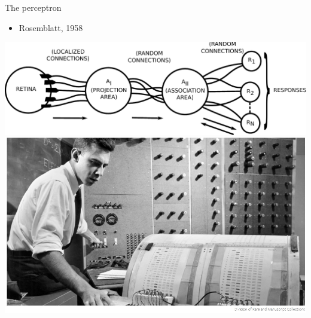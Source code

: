 \documentclass{beamer}
\begin{document}
\begin{frame}{The perceptron}
\begin{itemize}
\item Rosemblatt, 1958
\end{itemize}
\begin{center}
\includegraphics[scale=0.3]{pics/rosemblattsPERCEPTRON.pdf}
\includegraphics[scale=0.15]{pics/Rosenblatt.jpg}
\end{center}


\end{frame}
\end{document}
